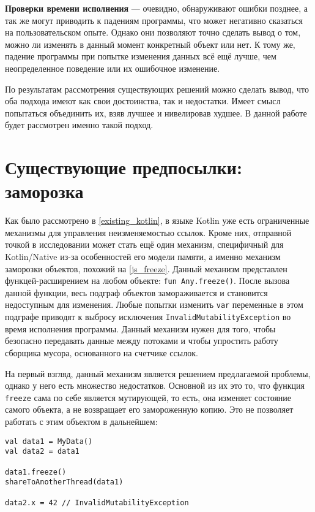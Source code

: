 \documentclass[specification,annotation,times]{itmo-student-thesis}
\begin{document}
\textbf{Проверки времени исполнения} --- очевидно, обнаруживают ошибки позднее, а так же могут приводить к падениям программы, что может негативно сказаться на пользовательском опыте.
Однако они позволяют точно сделать вывод о том, можно ли изменять в данный момент конкретный объект или нет.
К тому же, падение программы при попытке изменения данных всё ещё лучше, чем неопределенное поведение или их ошибочное изменение.  

По результатам рассмотрения существующих решений можно сделать вывод, что оба подхода имеют как свои достоинства, так и недостатки. Имеет смысл попытаться объединить их, взяв лучшее и нивелировав худшее. В данной работе будет рассмотрен именно такой подход.


\section{Существующие предпосылки: заморозка}

Как было рассмотрено в \ref{existing_kotlin}, в языке Kotlin уже есть ограниченные механизмы для управления неизменяемостью ссылок.
Кроме них, отправной точкой в исследовании может стать ещё один механизм, специфичный для Kotlin/Native из-за особенностей его модели памяти, а именно механизм заморозки объектов, похожий на \ref{js_freeze}.
Данный механизм представлен функцей-расширением на любом объекте: \texttt{fun Any.freeze()}.
После вызова данной функции, весь подграф объектов замораживается и становится недоступным для изменения.
Любые попытки изменить \texttt{var} переменные в этом подграфе приводят к выбросу исключения \texttt{InvalidMutabilityException} во время исполнения программы.
Данный механизм нужен для того, чтобы безопасно передавать данные между потоками и чтобы упростить работу сборщика мусора, основанного на счетчике ссылок.

На первый взгляд, данный механизм является решением предлагаемой проблемы, однако у него есть множество недостатков.
Основной из их это то, что функция \texttt{freeze} сама по себе является мутирующей, то есть, она изменяет состояние самого объекта, а не возвращает его замороженную копию. Это не позволяет работать с этим объектом в дальнейшем:

\begin{lstlisting}
val data1 = MyData()
val data2 = data1

data1.freeze()
shareToAnotherThread(data1)

data2.x = 42 // InvalidMutabilityException
\end{lstlisting}
\end{document}
